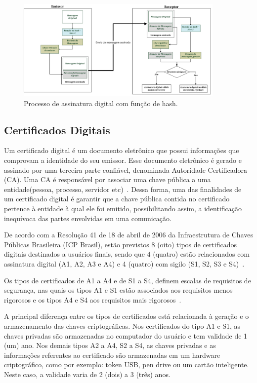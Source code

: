 \begin{figure}[!htb]
\centering
\includegraphics[width=0.9\textwidth]{esquema_assinatura_digital.png}
\caption{Processo de assinatura digital com função de hash.}
\label{fig:esquemaassinaturadigital}
\end{figure}

\subsection{Certificados Digitais}

Um certificado digital é um documento eletrônico que possui informações que comprovam a identidade do seu emissor. Esse documento eletrônico é gerado e assinado por uma terceira parte confiável, denominada Autoridade Certificadora (CA). Uma CA é responsável por associar uma chave pública a uma entidade(pessoa, processo, servidor etc)~\cite{forouzan2013redes}. Dessa forma, uma das finalidades de um certificado digital é garantir que a chave pública contida no certificado pertence à entidade à qual ele foi emitido, possibilitando assim, a identificação inequívoca das partes envolvidas em uma comunicação.

De acordo com a Resolução 41 de 18 de abril de 2006 da Infraestrutura de Chaves Públicas Brasileira (ICP Brasil), estão previstos 8 (oito) tipos de certificados digitais destinados a usuários finais, sendo que 4 (quatro) estão relacionados com assinatura digital (A1, A2, A3 e A4) e 4 (quatro) com sigilo (S1, S2, S3 e S4)~\cite{resolucao41icpbrasil1}.

Os tipos de certificados de A1 a A4 e de S1 a S4, definem escalas de requisitos de segurança, nas quais os tipos A1 e S1 estão associados aos requisitos menos rigorosos e os tipos A4 e S4 aos requisitos mais rigorosos~\cite{resolucao41icpbrasil1}.

A principal diferença entre os tipos de certificados está relacionada à geração e o armazenamento das chaves criptográficas. Nos certificados do tipo A1 e S1, as chaves privadas são armazenadas no computador do usuário e tem validade de 1 (um) ano. Nos demais tipos A2 a A4, S2 a S4, as chaves privadas e as informações referentes ao certificado são armazenadas em um hardware criptográfico, como por exemplo: token USB, pen drive ou um cartão inteligente. Neste caso, a validade varia de 2 (dois) a 3 (três) anos.

